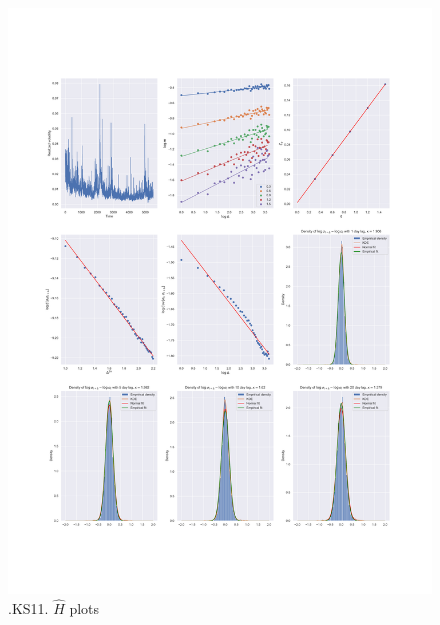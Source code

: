 	\begin{figure}[h]
		\centering
		\includegraphics[width=\linewidth]{fig/.KS11.pdf}
		\caption{.KS11. $\hat{H}$ plots}
	\end{figure}

